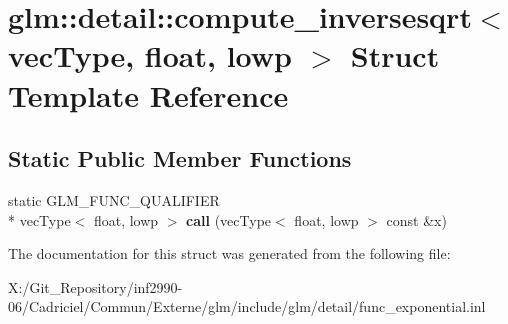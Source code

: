 \hypertarget{structglm_1_1detail_1_1compute__inversesqrt_3_01vec_type_00_01float_00_01lowp_01_4}{\section{glm\-:\-:detail\-:\-:compute\-\_\-inversesqrt$<$ vec\-Type, float, lowp $>$ Struct Template Reference}
\label{structglm_1_1detail_1_1compute__inversesqrt_3_01vec_type_00_01float_00_01lowp_01_4}
}
\subsection*{Static Public Member Functions}
\begin{DoxyCompactItemize}
\item 
\hypertarget{structglm_1_1detail_1_1compute__inversesqrt_3_01vec_type_00_01float_00_01lowp_01_4_a943fd9690f6c1fcb7383bfbcde30c3fb}{static G\-L\-M\-\_\-\-F\-U\-N\-C\-\_\-\-Q\-U\-A\-L\-I\-F\-I\-E\-R \\*
vec\-Type$<$ float, lowp $>$ {\bfseries call} (vec\-Type$<$ float, lowp $>$ const \&x)}\label{structglm_1_1detail_1_1compute__inversesqrt_3_01vec_type_00_01float_00_01lowp_01_4_a943fd9690f6c1fcb7383bfbcde30c3fb}

\end{DoxyCompactItemize}


The documentation for this struct was generated from the following file\-:\begin{DoxyCompactItemize}
\item 
X\-:/\-Git\-\_\-\-Repository/inf2990-\/06/\-Cadriciel/\-Commun/\-Externe/glm/include/glm/detail/func\-\_\-exponential.\-inl\end{DoxyCompactItemize}
